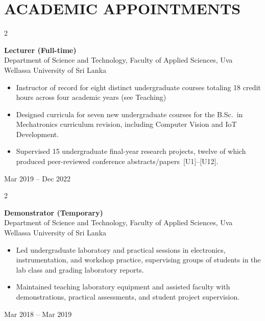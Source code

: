 \documentclass[10pt, letterpaper]{article}
\newenvironment{highlights}{%
    \begin{itemize}[topsep=0.08cm, parsep=0.08cm, partopsep=0pt,
                    itemsep=0pt, leftmargin=0.4cm + 10pt]
}{\end{itemize}}
\newenvironment{twocolentry}[2][]{%
    \onecolentry
    \def\secondColumn{#2}
    \setcolumnwidth{\fill, 4.2cm}
    \begin{paracol}{2}
}{%
    \switchcolumn \raggedleft \secondColumn
    \end{paracol}
    \endonecolentry
}
\begin{document}
\section{ACADEMIC APPOINTMENTS}
\vspace{0.08cm}

\begin{twocolentry}{Mar 2019 -- Dec 2022}
    \textbf{Lecturer (Full-time)} \\
    Department of Science and Technology, Faculty of Applied Sciences,
    Uva Wellassa University of Sri Lanka
    \begin{highlights}
        \item Instructor of record for eight distinct undergraduate courses totaling 18 credit hours across four academic years (see Teaching)

        \item Designed curricula for seven new undergraduate courses for the
              B.Sc.\ in Mechatronics curriculum revision, including Computer
              Vision and IoT Development.

        \item Supervised 15 undergraduate final-year research projects, twelve of
              which produced peer-reviewed conference abstracts/papers~[U1]--[U12].
    \end{highlights}
    \vspace{0.12cm}
\end{twocolentry}

\begin{twocolentry}{Mar 2018 -- Mar 2019}
    \textbf{Demonstrator (Temporary)} \\
    Department of Science and Technology, Faculty of Applied Sciences,
    Uva Wellassa University of Sri Lanka
    \begin{highlights}
        \item Led undergraduate laboratory and practical sessions in electronics,
              instrumentation, and workshop practice, supervising groups of
              students in the lab class and grading laboratory reports.

        \item Maintained teaching laboratory equipment and assisted faculty with
              demonstrations, practical assessments, and student project
              supervision.
    \end{highlights}
    \vspace{0.08cm}
\end{twocolentry}
\end{document}
